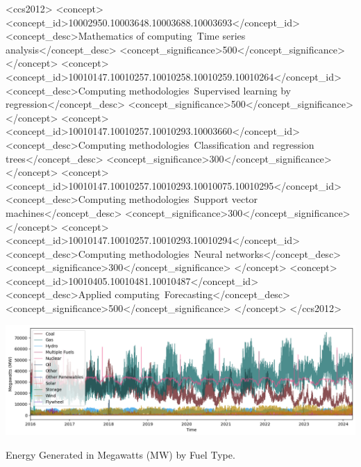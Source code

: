 \documentclass[sigconf]{acmart}
\begin{document}
\begin{CCSXML}
<ccs2012>
   <concept>
       <concept_id>10002950.10003648.10003688.10003693</concept_id>
       <concept_desc>Mathematics of computing~Time series analysis</concept_desc>
       <concept_significance>500</concept_significance>
       </concept>
   <concept>
       <concept_id>10010147.10010257.10010258.10010259.10010264</concept_id>
       <concept_desc>Computing methodologies~Supervised learning by regression</concept_desc>
       <concept_significance>500</concept_significance>
       </concept>
   <concept>
       <concept_id>10010147.10010257.10010293.10003660</concept_id>
       <concept_desc>Computing methodologies~Classification and regression trees</concept_desc>
       <concept_significance>300</concept_significance>
       </concept>
   <concept>
       <concept_id>10010147.10010257.10010293.10010075.10010295</concept_id>
       <concept_desc>Computing methodologies~Support vector machines</concept_desc>
       <concept_significance>300</concept_significance>
       </concept>
   <concept>
       <concept_id>10010147.10010257.10010293.10010294</concept_id>
       <concept_desc>Computing methodologies~Neural networks</concept_desc>
       <concept_significance>300</concept_significance>
       </concept>
   <concept>
       <concept_id>10010405.10010481.10010487</concept_id>
       <concept_desc>Applied computing~Forecasting</concept_desc>
       <concept_significance>500</concept_significance>
       </concept>
 </ccs2012>
\end{CCSXML}


\begin{teaserfigure}
  \includegraphics[width=\textwidth]{Images/Energy_Gen_Teaser.png}
  \caption{Energy Generated in Megawatts (MW) by Fuel Type.}
  \Description{}
  \label{fig:teaser}
\end{teaserfigure}
\end{document}
